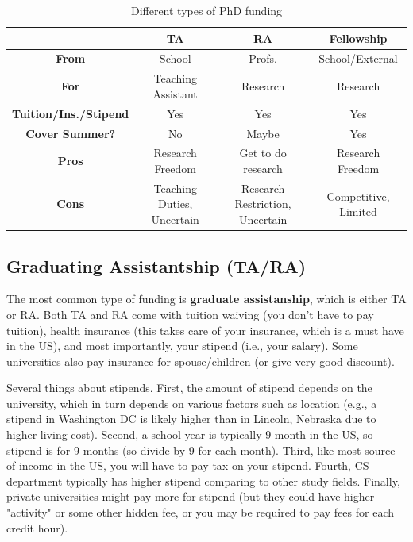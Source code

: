 \documentclass[11pt]{article}
\begin{document}
\begin{table}
  \centering
  \footnotesize
  \caption{Different types of PhD funding}\label{tab:funding}
  \begin{tabular}{c|c|c|c}
    \toprule
    &\textbf{TA}&\textbf{RA}&\textbf{Fellowship}\\
    \midrule
    \textbf{From} & School & Profs. & School/External\\
    \textbf{For}                  & Teaching Assistant       & Research                        & Research                              \\
    \textbf{Tuition/Ins./Stipend} & Yes                      & Yes                             & Yes                                   \\
    \textbf{Cover Summer?}              & No                       & Maybe                           & Yes                                   \\
    \midrule
    \textbf{Pros}                 & Research Freedom         & Get to do research              & Research Freedom                      \\
    \textbf{Cons}                 & Teaching Duties, Uncertain            & Research Restriction, Uncertain & Competitive, Limited             \\
    \bottomrule
  \end{tabular}
\end{table}

\subsection{Graduating Assistantship (TA/RA)}
The most common type of funding is \textbf{graduate assistanship}, which is either TA or RA. Both TA and RA come with tuition waiving (you don't have to pay tuition), health insurance (this takes care of your insurance, which is a must have in the US), and most importantly, your stipend (i.e., your salary). Some universities also pay insurance for spouse/children (or give very good discount).

Several things about stipends.  First, the amount of stipend depends on the university, which in turn depends on various factors such as location (e.g., a stipend in Washington DC is likely higher than in Lincoln, Nebraska due to higher living cost). Second, a school year is typically 9-month in the US, so stipend is for 9 months (so divide by 9 for each month). Third, like most source of income in the US, you will have to pay tax on your stipend.  Fourth, CS department typically has higher stipend comparing to other study fields.  Finally, private universities might pay more for stipend (but they could have higher "activity" or some other hidden fee, or you may be required to pay fees for each credit hour).
\end{document}
